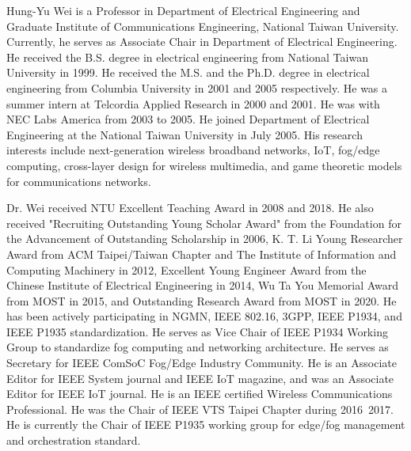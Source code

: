 \documentclass[10pt,journal, compsoc]{IEEEtran}
\begin{document}
\begin{IEEEbiography}{Hung-Yu Wei} is a Professor in Department of Electrical Engineering and Graduate Institute of Communications Engineering, National Taiwan University. Currently, he serves as Associate Chair in Department of Electrical Engineering. He received the B.S. degree in electrical engineering from National Taiwan University in 1999. He received the M.S. and the Ph.D. degree in electrical engineering from Columbia University in 2001 and 2005 respectively. He was a summer intern at Telcordia Applied Research in 2000 and 2001. He was with NEC Labs America from 2003 to 2005. He joined Department of Electrical Engineering at the National Taiwan University in July 2005. His research interests include next-generation wireless broadband networks, IoT, fog/edge computing, cross-layer design for wireless multimedia, and game theoretic models for communications networks.

Dr. Wei received NTU Excellent Teaching Award in 2008 and 2018. He also received "Recruiting Outstanding Young Scholar Award" from the Foundation for the Advancement of Outstanding Scholarship in 2006, K. T. Li Young Researcher Award from ACM Taipei/Taiwan Chapter and The Institute of Information and Computing Machinery in 2012, Excellent Young Engineer Award from the Chinese Institute of Electrical Engineering in 2014, Wu Ta You Memorial Award from MOST in 2015, and Outstanding Research Award from MOST in 2020. He has been actively participating in NGMN, IEEE 802.16, 3GPP, IEEE P1934, and IEEE P1935 standardization. He serves as Vice Chair of IEEE P1934 Working Group to standardize fog computing and networking architecture. He serves as Secretary for IEEE ComSoC Fog/Edge Industry Community. He is an Associate Editor for IEEE System journal and IEEE IoT magazine, and was an Associate Editor for IEEE IoT journal. He is an IEEE certified Wireless Communications Professional. He was the Chair of IEEE VTS Taipei Chapter during 2016~2017. He is currently the Chair of IEEE P1935 working group for edge/fog management and orchestration standard.

\end{IEEEbiography}
\fi
\end{document}
